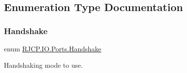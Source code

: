 \subsection{Enumeration Type Documentation}
\mbox{\label{namespace_r_j_c_p_1_1_i_o_1_1_ports_a5328e888558ed5726b3fb7b8b692527c}} 
\subsubsection{\texorpdfstring{Handshake}{Handshake}}
{\footnotesize\ttfamily enum \mbox{\hyperlink{namespace_r_j_c_p_1_1_i_o_1_1_ports_a5328e888558ed5726b3fb7b8b692527c}{R\+J\+C\+P.\+I\+O.\+Ports.\+Handshake}}\hspace{0.3cm}{\ttfamily [strong]}}



Handshaking mode to use. 

